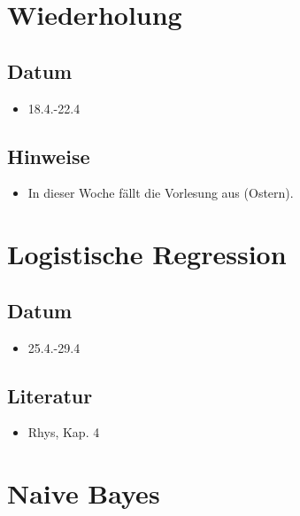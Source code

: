 \documentclass[
]{book}
\providecommand{\tightlist}{%
  \setlength{\itemsep}{0pt}\setlength{\parskip}{0pt}}
\begin{document}
\hypertarget{wiederholung}{%
\section{Wiederholung}\label{wiederholung}}

\hypertarget{datum-5}{%
\subsection{Datum}\label{datum-5}}

\begin{itemize}
\tightlist
\item
  18.4.-22.4
\end{itemize}

\hypertarget{hinweise-2}{%
\subsection{Hinweise}\label{hinweise-2}}

\begin{itemize}
\tightlist
\item
  In dieser Woche fällt die Vorlesung aus (Ostern).
\end{itemize}

\hypertarget{logistische-regression}{%
\section{Logistische Regression}\label{logistische-regression}}

\hypertarget{datum-6}{%
\subsection{Datum}\label{datum-6}}

\begin{itemize}
\tightlist
\item
  25.4.-29.4
\end{itemize}

\hypertarget{literatur-6}{%
\subsection{Literatur}\label{literatur-6}}

\begin{itemize}
\tightlist
\item
  Rhys, Kap. 4
\end{itemize}

\hypertarget{naive-bayes}{%
\section{Naive Bayes}\label{naive-bayes}}
\end{document}
